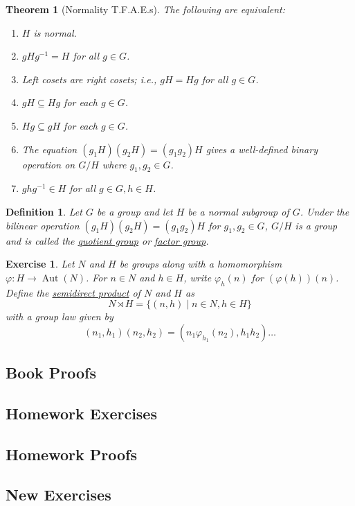 \documentclass[12pt]{article}
\newtheorem{defn}{Definition}
\newtheorem{thm}{Theorem}
\newtheorem{exer}{Exercise}
\numberwithin{problem}{section} %
\numberwithin{defn}{section} %
\numberwithin{thm}{section} %
\numberwithin{exer}{section} %
\theoremstyle{remark}  %
\begin{document}
\setcounter{thm}{30}
\begin{thm}[Normality T.F.A.E.s]
    The following are equivalent:
    \begin{enumerate}
        \item $H$ is normal.
        \item $gHg^{-1}=H$ for all $g\in G$.
        \item Left cosets are right cosets; i.e., $gH=Hg$ for all $g\in G$.
        \item $gH \subseteq Hg$ for each $g \in G$.
        \item $Hg \subseteq gH$ for each $g \in G$.
        \item The equation $(g_1H)(g_2H)=(g_1g_2)H$ gives a well-defined binary operation on $G/H$ where $g_1,g_2\in G$.
        \item $ghg^{-1} \in H$ for all $g\in G, h\in H$.
    \end{enumerate}
\end{thm}

\setcounter{defn}{31}
\begin{defn}
    Let $G$ be a group and let $H$ be a normal subgroup of $G$. Under the bilinear operation $(g_1H)(g_2H)=(g_1g_2)H$ for $g_1,g_2\in G$, $G/H$ is a group and is called the \ul{quotient group} or \ul{factor group}.
\end{defn}

\setcounter{exer}{150}
\begin{exer}
    Let $N$ and $H$ be groups along with a homomorphism $\varphi\operatorname{:} H\to \operatorname{Aut}(N)$. For $n\in N$ and $h\in H$, write $\varphi_h(n)$ for $(\varphi(h))(n)$. Define the \ul{semidirect product} of $N$ and $H$ as $$N \rtimes H = \{(n,h) \mid n\in N, h\in H\}$$ with a group law given by $$(n_1,h_1)(n_2,h_2)=(n_1\varphi_{h_1}(n_2),h_1h_2)\dots$$
\end{exer}

\subsection{Book Proofs}

\subsection{Homework Exercises}

\subsection{Homework Proofs}

\subsection{New Exercises}
\end{document}
